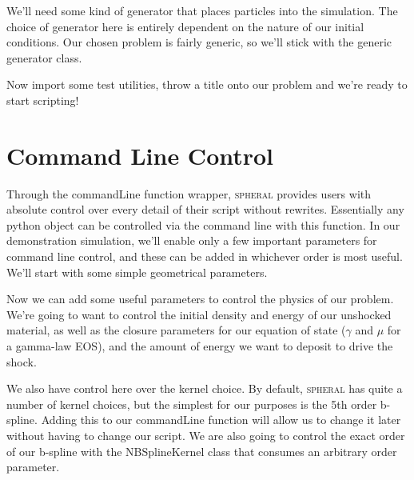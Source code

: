 \documentclass[11pt]{memoir}
\begin{document}


We'll need some kind of generator that places particles into the simulation. 
The choice of generator here is entirely dependent on the nature of our initial conditions. 
Our chosen problem is fairly generic, so we'll stick with the generic generator class.



Now import some test utilities, throw a title onto our problem and we're ready to start scripting!



\section{Command Line Control}

Through the commandLine function wrapper, \textsc{spheral} provides users with absolute control over every detail of their script without rewrites. 
Essentially any python object can be controlled via the command line with this function. 
In our demonstration simulation, we'll enable only a few important parameters for command line control, and these can be added in whichever order is most useful. 
We'll start with some simple geometrical parameters.



Now we can add some useful parameters to control the physics of our problem. 
We're going to want to control the initial density and energy of our unshocked material, as well as the closure parameters for our equation of state ($\gamma$ and $\mu$ for a gamma-law EOS), and the amount of energy we want to deposit to drive the shock.



We also have control here over the kernel choice. 
By default, \textsc{spheral} has quite a number of kernel choices, but the simplest for our purposes is the 5th order b-spline. 
Adding this to our commandLine function will allow us to change it later without having to change our script. 
We are also going to control the exact order of our b-spline with the NBSplineKernel class that consumes an arbitrary order parameter.
\end{document}

